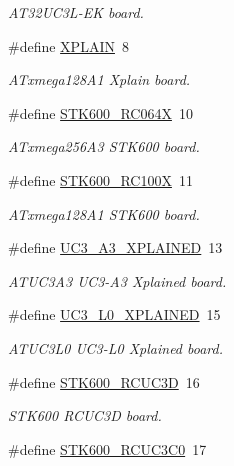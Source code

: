 \begin{DoxyCompactItemize}
\begin{DoxyCompactList}\small\item\em A\+T32\+U\+C3\+L-\/\+EK board. \end{DoxyCompactList}\item 
\#define \mbox{\hyperlink{group__group__common__boards_ga5c3d6ea6d4027a39a00ab973ec088853}{X\+P\+L\+A\+IN}}~8
\begin{DoxyCompactList}\small\item\em A\+Txmega128\+A1 Xplain board. \end{DoxyCompactList}\item 
\#define \mbox{\hyperlink{group__group__common__boards_ga54d846b1bcede53f8a10bec70bb14b82}{S\+T\+K600\+\_\+\+R\+C064X}}~10
\begin{DoxyCompactList}\small\item\em A\+Txmega256\+A3 S\+T\+K600 board. \end{DoxyCompactList}\item 
\#define \mbox{\hyperlink{group__group__common__boards_ga72882e3e8e7a4e04ebf8749f2d995089}{S\+T\+K600\+\_\+\+R\+C100X}}~11
\begin{DoxyCompactList}\small\item\em A\+Txmega128\+A1 S\+T\+K600 board. \end{DoxyCompactList}\item 
\#define \mbox{\hyperlink{group__group__common__boards_ga6dba56934e370fd84b3126a71bd356e7}{U\+C3\+\_\+\+A3\+\_\+\+X\+P\+L\+A\+I\+N\+ED}}~13
\begin{DoxyCompactList}\small\item\em A\+T\+U\+C3\+A3 U\+C3-\/\+A3 Xplained board. \end{DoxyCompactList}\item 
\#define \mbox{\hyperlink{group__group__common__boards_ga200ef6ece7fd63cb742129efac4a935e}{U\+C3\+\_\+\+L0\+\_\+\+X\+P\+L\+A\+I\+N\+ED}}~15
\begin{DoxyCompactList}\small\item\em A\+T\+U\+C3\+L0 U\+C3-\/\+L0 Xplained board. \end{DoxyCompactList}\item 
\#define \mbox{\hyperlink{group__group__common__boards_gaa29dce837106d550e81421fa51e62ce7}{S\+T\+K600\+\_\+\+R\+C\+U\+C3D}}~16
\begin{DoxyCompactList}\small\item\em S\+T\+K600 R\+C\+U\+C3D board. \end{DoxyCompactList}\item 
\#define \mbox{\hyperlink{group__group__common__boards_ga1316c2c38800ce76bb12e7a76c66bdaf}{S\+T\+K600\+\_\+\+R\+C\+U\+C3\+C0}}~17

\end{DoxyCompactItemize}
